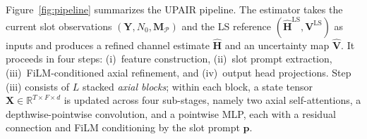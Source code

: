 \documentclass[conference,letterpaper]{IEEEtran}
\begin{document}
	Figure~\ref{fig:pipeline} summarizes the UPAIR{} pipeline.
	The estimator takes the current slot observations $(\mathbf{Y}, N_0, \mathbf{M}_{\mathcal{P}})$ and the LS reference $(\widehat{\mathbf{H}}^{\mathrm{LS}}, \mathbf{V}^{\mathrm{LS}})$ as inputs and produces a refined channel estimate $\widehat{\mathbf{H}}$ and an uncertainty map $\widehat{\mathbf{V}}$.
	It proceeds in four steps: (i)~feature construction, (ii)~slot prompt extraction, (iii)~FiLM-conditioned axial refinement, and (iv)~output head projections.
	Step (iii) consists of $L$ stacked \emph{axial blocks}; within each block, a state tensor $\mathbf{X}\in\mathbb{R}^{T\times F\times d}$ is updated across four sub-stages, namely two axial self-attentions, a depthwise-pointwise convolution, and a pointwise MLP, each with a residual connection and FiLM conditioning by the slot prompt $\mathbf{p}$.
	\vspace{-.1cm}
\end{document}
